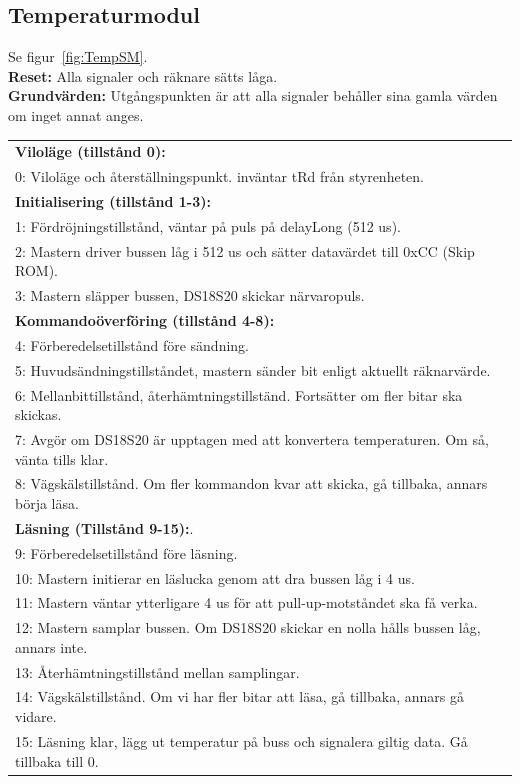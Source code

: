 \documentclass[a4paper,11pt]{article}
\begin{document}
	\pagebreak

		\subsection{Temperaturmodul}
			Se figur~\ref{fig:TempSM}.\\
			{\bf Reset:} Alla signaler och räknare sätts låga.\\
			{\bf Grundvärden:} Utgångspunkten är att alla signaler behåller sina gamla värden om inget annat anges.\\
			\begin{tabular}{l}
				\\{\bf Viloläge (tillstånd 0):}\\
				0: Viloläge och återställningspunkt. inväntar tRd från styrenheten.\\
				{\bf Initialisering (tillstånd 1-3):}\\
				1: Fördröjningstillstånd, väntar på puls på delayLong (512 us).\\
				2: Mastern driver bussen låg i 512 us och sätter datavärdet till 0xCC (Skip ROM).\\
				3: Mastern släpper bussen, DS18S20 skickar närvaropuls.\\
				{\bf Kommandoöverföring (tillstånd 4-8):}\\
				4: Förberedelsetillstånd före sändning.\\
				5: Huvudsändningstillståndet, mastern sänder bit enligt aktuellt räknarvärde.\\
				6: Mellanbittillstånd, återhämtningstillständ. Fortsätter om fler bitar ska skickas.\\
				7: Avgör om DS18S20 är upptagen med att konvertera temperaturen. Om så, vänta tills klar.\\
				8: Vägskälstillstånd. Om fler kommandon kvar att skicka, gå tillbaka, annars börja läsa.\\
				{\bf Läsning (Tillstånd 9-15):}.\\
				9:  Förberedelsetillstånd före läsning.\\
				10: Mastern initierar en läslucka genom att dra bussen låg i 4 us.\\
				11: Mastern väntar ytterligare 4 us för att pull-up-motståndet ska få verka.\\
				12: Mastern samplar bussen. Om DS18S20 skickar en nolla hålls bussen låg, annars inte.\\
				13: Återhämtningstillstånd mellan samplingar.\\
				14: Vägskälstillstånd. Om vi har fler bitar att läsa, gå tillbaka, annars gå vidare.\\
				15: Läsning klar, lägg ut temperatur på buss och signalera giltig data. Gå tillbaka till 0.\\
			\end{tabular}
\end{document}
